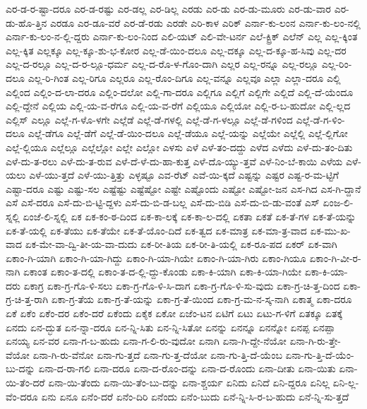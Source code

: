 {ಎರ-ಡ-ರ-ಷ್ಟಾ-ದರೂ
ಎರ-ಡ-ರಷ್ಟು
ಎರ-ಡಲ್ಲ
ಎರ-ಡಿಲ್ಲ
ಎರಡು
ಎರ-ಡು
ಎರ-ಡು-ಮೂರು
ಎರ-ಡು-ವಾರ
ಎರ-ಡು-ಹೊ-ತ್ತಿನ
ಎರಡೂ
ಎರ-ಡೂ-ವರೆ
ಎರ-ಡೆ-ರಡು
ಎರಡೇ
ಎರಿ-ಕಾಳ
ಎರಿಕ್
ಎರ್ನಾ-ಕು-ಲಂನ
ಎರ್ನಾ-ಕು-ಲಂ-ನಲ್ಲಿ
ಎರ್ನಾ-ಕು-ಲಂ-ನ-ಲ್ಲಿ-ದ್ದರು
ಎರ್ನಾ-ಕು-ಲಂ-ನಿಂದ
ಎಲಿ-ಯಟ್
ಎಲಿ-ವೇ-ಟರ್ನ
ಎಲೆ-ಕ್ಟ್ರಿಕ್
ಎಲೆನ್
ಎಲ್ಲ
ಎಲ್ಲ-ಕ್ಕಿಂತ
ಎಲ್ಲ-ಕ್ಕಿತ
ಎಲ್ಲಕ್ಕೂ
ಎಲ್ಲ-ಕ್ಕೂ-ಶು-ಭ-ಕೋರ
ಎಲ್ಲ-ಡೆ-ಯಿಂ-ದಲೂ
ಎಲ್ಲ-ದಕ್ಕೂ
ಎಲ್ಲ-ದ-ಕ್ಕೂ-ಹ-ಸಿವು
ಎಲ್ಲ-ದರ
ಎಲ್ಲ-ದ-ರಲ್ಲೂ
ಎಲ್ಲ-ದ-ರ-ಲ್ಲೂ-ಧರ್ಮ
ಎಲ್ಲ-ದ-ರೊ-ಳ-ಗೊಂ-ದಾಗಿ
ಎಲ್ಲರ
ಎಲ್ಲ-ರನ್ನೂ
ಎಲ್ಲ-ರಲ್ಲೂ
ಎಲ್ಲ-ರಿಂ-ದಲೂ
ಎಲ್ಲ-ರಿ-ಗಿಂತ
ಎಲ್ಲ-ರಿಗೂ
ಎಲ್ಲರೂ
ಎಲ್ಲ-ರೊಂ-ದಿಗೂ
ಎಲ್ಲ-ವನ್ನೂ
ಎಲ್ಲವೂ
ಎಲ್ಲಾ
ಎಲ್ಲಾ-ದರೂ
ಎಲ್ಲಿ
ಎಲ್ಲಿಂದ
ಎಲ್ಲಿಂ-ದ-ಲಾ-ದರೂ
ಎಲ್ಲಿಂ-ದಲೋ
ಎಲ್ಲಿ-ಗಾ-ದರೂ
ಎಲ್ಲಿಗೂ
ಎಲ್ಲಿಗೆ
ಎಲ್ಲಿಗೇ
ಎಲ್ಲಿದೆ
ಎಲ್ಲಿ-ದೆ-ಯೆಂದೂ
ಎಲ್ಲಿ-ದ್ದೇನೆ
ಎಲ್ಲಿಯ
ಎಲ್ಲಿ-ಯ-ವ-ರೆಗೂ
ಎಲ್ಲಿ-ಯ-ವ-ರೆಗೆ
ಎಲ್ಲಿಯೂ
ಎಲ್ಲಿಯೋ
ಎಲ್ಲಿ-ರ-ಬ-ಹುದೋ
ಎಲ್ಲಿ-ಲ್ಲದ
ಎಲ್ಲಿಸ್
ಎಲ್ಲೂ
ಎಲ್ಲೆ-ಗ-ಳೊ-ಳಗೇ
ಎಲ್ಲೆಡೆ
ಎಲ್ಲೆ-ಡೆ-ಗಳಲ್ಲಿ
ಎಲ್ಲೆ-ಡೆ-ಗ-ಳಲ್ಲೂ
ಎಲ್ಲೆ-ಡೆ-ಗಳಿಂದ
ಎಲ್ಲೆ-ಡೆ-ಗ-ಳಿಂ-ದಲೂ
ಎಲ್ಲೆ-ಡೆಗೂ
ಎಲ್ಲೆ-ಡೆಗೆ
ಎಲ್ಲೆ-ಡೆ-ಯಿಂ-ದಲೂ
ಎಲ್ಲೆ-ಡೆಯೂ
ಎಲ್ಲೆ-ಯನ್ನು
ಎಲ್ಲೆಯೇ
ಎಲ್ಲೆಲ್ಲಿ
ಎಲ್ಲೆ-ಲ್ಲಿಗೋ
ಎಲ್ಲೆ-ಲ್ಲಿಯೂ
ಎಲ್ಲೆಲ್ಲೂ
ಎಲ್ಲೆಲ್ಲೋ
ಎಲ್ಲೇ
ಎಲ್ಲೋ
ಎಳಸು
ಎಳೆ
ಎಳೆ-ತಂ-ದದ್ದು
ಎಳೆದ
ಎಳೆದು
ಎಳೆ-ದು-ತಂ-ದಿತು
ಎಳೆ-ದು-ತ-ರಲು
ಎಳೆ-ದು-ತ-ರುವ
ಎಳೆ-ದೆ-ಳೆ-ದು-ಹಾ-ಕುತ್ತ
ಎಳೆ-ದೊ-ಯ್ಯು-ತ್ತವೆ
ಎಳೆ-ನಿಂ-ಬೆ-ಕಾಯಿ
ಎಳೆಯ
ಎಳೆ-ಯಲು
ಎಳೆ-ಯು-ತ್ತದೆ
ಎಳೆ-ಯು-ತ್ತಿತ್ತು
ಎಳ್ಳಷ್ಟೂ
ಎವ-ರೆಟ್
ಎವೆ-ಯಿ-ಕ್ಕದೆ
ಎಷ್ಟನ್ನು
ಎಷ್ಟರ
ಎಷ್ಟ-ರ-ಮ-ಟ್ಟಿಗೆ
ಎಷ್ಟಾ-ದರೂ
ಎಷ್ಟು
ಎಷ್ಟು-ಸಲ
ಎಷ್ಟೆಷ್ಟು
ಎಷ್ಟೆಷ್ಟೋ
ಎಷ್ಟೇ
ಎಷ್ಟೊಂದು
ಎಷ್ಟೋ
ಎಷ್ಟೋ-ಜನ
ಎಸ-ಗಿದ
ಎಸ-ಗಿ-ದ್ದಾನೆ
ಎಸೆ
ಎಸೆ-ದರೂ
ಎಸೆ-ದು-ಬಿ-ಟ್ಟಿ-ದ್ದಳು
ಎಸೆ-ದು-ಬಿ-ಡ-ಬಲ್ಲ
ಎಸೆ-ದು-ಬಿಡಿ
ಎಸೆ-ದು-ಬಿ-ಡು-ವಂತೆ
ಎಸ್
ಏಂಜ-ಲಿ-ಸ್ನಲ್ಲಿ
ಏಂಜೆ-ಲಿ-ಸ್ನಲ್ಲಿ
ಏಕ
ಏಕ-ಕಂ-ಠ-ದಿಂದ
ಏಕ-ಕಾ-ಲಕ್ಕೆ
ಏಕ-ಕಾ-ಲ-ದಲ್ಲಿ
ಏಕತಾ
ಏಕತೆ
ಏಕ-ತೆ-ಗಳ
ಏಕ-ತೆ-ಯನ್ನು
ಏಕ-ತೆ-ಯಲ್ಲಿ
ಏಕ-ತೆಯು
ಏಕ-ತೆಯೇ
ಏಕ-ತೆ-ಯೊಂ-ದಿದೆ
ಏಕ-ತ್ವದ
ಏಕ-ಮಾತ್ರ
ಏಕ-ಮಾ-ತ್ರ-ವಾದ
ಏಕ-ಮು-ಖ-ವಾದ
ಏಕ-ಮೇ-ವಾ-ದ್ವಿ-ತೀ-ಯ-ವಾ-ದುದು
ಏಕ-ರೀ-ತಿಯ
ಏಕ-ರೀ-ತಿ-ಯಲ್ಲಿ
ಏಕ-ರೂ-ಪದ
ಏಕರ್
ಏಕ-ವಾಗಿ
ಏಕಾಂ-ಗಿ-ಯಾಗಿ
ಏಕಾಂ-ಗಿ-ಯಾ-ಗಿದ್ದು
ಏಕಾಂ-ಗಿ-ಯಾ-ಗಿಯೇ
ಏಕಾಂ-ಗಿ-ಯಾ-ಗಿರು
ಏಕಾಂ-ಗಿಯೂ
ಏಕಾಂ-ಗಿ-ವೀ-ರ-ನಾಗಿ
ಏಕಾಂತ
ಏಕಾಂ-ತ-ದಲ್ಲಿ
ಏಕಾಂ-ತ-ದ-ಲ್ಲಿ-ದ್ದು-ಕೊಂಡು
ಏಕಾ-ಕಿ-ಯಾಗಿ
ಏಕಾ-ಕಿ-ಯಾ-ಗಿಯೇ
ಏಕಾ-ಕಿ-ಯಾ-ದರು
ಏಕಾಗ್ರ
ಏಕಾ-ಗ್ರ-ಗೊ-ಳಿ-ಸಲು
ಏಕಾ-ಗ್ರ-ಗೊ-ಳಿ-ಸಿ-ದಾಗ
ಏಕಾ-ಗ್ರ-ಗೊ-ಳಿ-ಸು-ವುದು
ಏಕಾ-ಗ್ರ-ಚಿ-ತ್ತ-ದಿಂದ
ಏಕಾ-ಗ್ರ-ಚಿ-ತ್ತ-ರಾಗಿ
ಏಕಾ-ಗ್ರ-ತೆಯ
ಏಕಾ-ಗ್ರ-ತೆ-ಯನ್ನು
ಏಕಾ-ಗ್ರ-ತೆ-ಯಿಂದ
ಏಕಾ-ಗ್ರ-ಮ-ನ-ಸ್ಕ-ನಾಗಿ
ಏಕಾತ್ಮ
ಏಕಾ-ದರೂ
ಏಕೆ
ಏಕೆಂ
ಏಕೆಂ-ದರ
ಏಕೆಂ-ದರೆ
ಏಕೆಂದು
ಏಕೈಕ
ಏಕೋ
ಏಜೆಂ-ಟನ
ಏಟಿಗೆ
ಏಟು
ಏಟು-ಗ-ಳಿಗೆ
ಏತಕ್ಕೂ
ಏತಕ್ಕೆ
ಏನದು
ಏನ-ದ್ಭುತ
ಏನ-ನ್ನಾ-ದರೂ
ಏನ-ನ್ನಿ-ಸಿತು
ಏನ-ನ್ನಿ-ಸಿತೋ
ಏನನ್ನು
ಏನನ್ನೂ
ಏನನ್ನೋ
ಏನಪ್ಪ
ಏನಪ್ಪಾ
ಏನಯ್ಯ
ಏನ-ವರ
ಏನಾ-ಗ-ಬ-ಹುದು
ಏನಾ-ಗ-ಲಿ-ರು-ವುದೋ
ಏನಾಗಿ
ಏನಾ-ಗಿ-ದ್ದೇ-ನೆಯೋ
ಏನಾ-ಗಿ-ರು-ತ್ತೇ-ವೆಯೋ
ಏನಾ-ಗಿ-ರು-ವೆನೋ
ಏನಾ-ಗು-ತ್ತದೆ
ಏನಾ-ಗು-ತ್ತ-ದೆಯೋ
ಏನಾ-ಗು-ತ್ತಿ-ದೆ-ಯೆಂಬ
ಏನಾ-ಗು-ತ್ತಿ-ದೆ-ಯೆಂ-ಬು-ದನ್ನು
ಏನಾ-ದ-ರಾ-ಗಲಿ
ಏನಾ-ದರೂ
ಏನಾ-ದ-ರೊಂ-ದನ್ನು
ಏನಾ-ದ-ರೊಂದು
ಏನಾ-ದೀತು
ಏನಾ-ಯಿತು
ಏನಾ-ಯಿ-ತೆಂ-ದರೆ
ಏನಾ-ಯಿ-ತೆಂದು
ಏನಾ-ಯಿ-ತೆಂ-ಬು-ದನ್ನು
ಏನಾ-ಶ್ಚರ್ಯ
ಏನಿದು
ಏನಿದೆ
ಏನಿ-ದ್ದರೂ
ಏನಿಲ್ಲ
ಏನಿ-ಲ್ಲ-ವೆಂ-ದರೂ
ಏನು
ಏನೂ
ಏನೆಂ-ದರೆ
ಏನೆಂ-ದಿರಿ
ಏನೆಂದು
ಏನೆಂ-ಬುದು
ಏನೆ-ನ್ನಿ-ಸಿ-ರ-ಬ-ಹುದು
ಏನೆ-ನ್ನಿ-ಸು-ತ್ತದೆ
}
